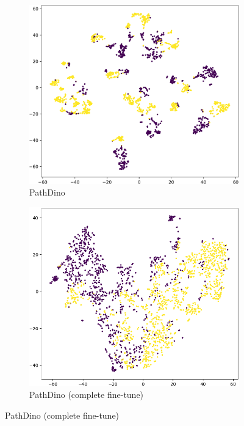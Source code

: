 \documentclass[peerreview]{IEEEtran}
\begin{document}
\begin{figure}[ht]
    \begin{subfigure}[b]{0.3\textwidth}
        \includegraphics[width=\textwidth]{figure/pathdino_tsne.png}
        \caption{PathDino}
        \label{fig:tsne_pathdino}
    \end{subfigure}
    \hfill
    \begin{subfigure}[b]{0.3\textwidth}
        \includegraphics[width=\textwidth]{figure/pathdino_finetuned_tsne.png}
        \caption{PathDino (complete fine-tune)}
        \label{fig:tsne_pathdino_complete_finetune}

\end{subfigure}
\end{figure}
\end{document}
